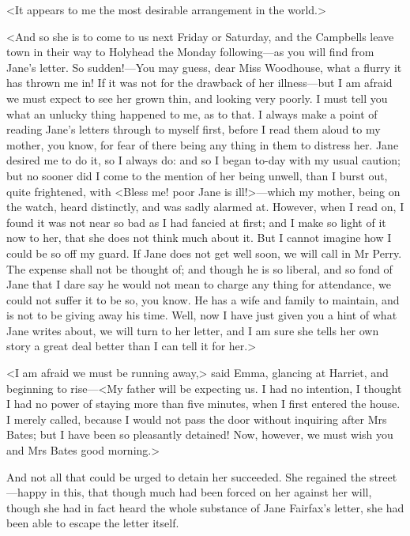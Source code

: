 <It appears to me the most desirable arrangement in the world.>

<And so she is to come to us next Friday or Saturday, and the Campbells leave town in their way to Holyhead the Monday following—as you will find from Jane's letter. So sudden!—You may guess, dear Miss Woodhouse, what a flurry it has thrown me in! If it was not for the drawback of her illness—but I am afraid we must expect to see her grown thin, and looking very poorly. I must tell you what an unlucky thing happened to me, as to that. I always make a point of reading Jane's letters through to myself first, before I read them aloud to my mother, you know, for fear of there being any thing in them to distress her. Jane desired me to do it, so I always do: and so I began to-day with my usual caution; but no sooner did I come to the mention of her being unwell, than I burst out, quite frightened, with <Bless me! poor Jane is ill!>—which my mother, being on the watch, heard distinctly, and was sadly alarmed at. However, when I read on, I found it was not near so bad as I had fancied at first; and I make so light of it now to her, that she does not think much about it. But I cannot imagine how I could be so off my guard. If Jane does not get well soon, we will call in Mr Perry. The expense shall not be thought of; and though he is so liberal, and so fond of Jane that I dare say he would not mean to charge any thing for attendance, we could not suffer it to be so, you know. He has a wife and family to maintain, and is not to be giving away his time. Well, now I have just given you a hint of what Jane writes about, we will turn to her letter, and I am sure she tells her own story a great deal better than I can tell it for her.>

<I am afraid we must be running away,> said Emma, glancing at Harriet, and beginning to rise—<My father will be expecting us. I had no intention, I thought I had no power of staying more than five minutes, when I first entered the house. I merely called, because I would not pass the door without inquiring after Mrs Bates; but I have been so pleasantly detained! Now, however, we must wish you and Mrs Bates good morning.>

And not all that could be urged to detain her succeeded. She regained the street—happy in this, that though much had been forced on her against her will, though she had in fact heard the whole substance of Jane Fairfax's letter, she had been able to escape the letter itself.